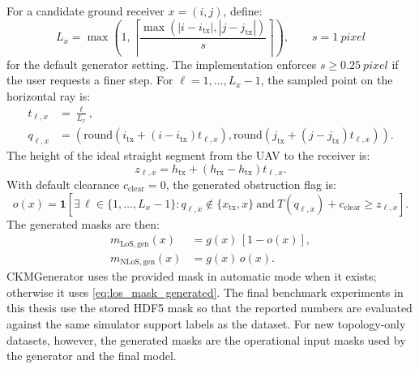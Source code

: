For a candidate ground receiver \(x=(i,j)\),
define:
\begin{equation}
  L_x
  =
  \max\!\left(
  1,
  \left\lceil
  \frac{\max(|i-i_{\mathrm{tx}}|,|j-j_{\mathrm{tx}}|)}{s}
  \right\rceil
  \right),
  \qquad s=\SI{1}{pixel}
  \label{eq:los_raycast_steps}
\end{equation}
for the default generator setting. The implementation enforces
\(s\ge \SI{0.25}{pixel}\) if the user requests a finer step. For
\(\ell=1,\ldots,L_x-1\), the sampled point on the horizontal ray is:
\begin{align}
  t_{\ell,x} &= \frac{\ell}{L_x},
  \label{eq:ray_t}\\
  q_{\ell,x}
  &=
  \left(
  \mathrm{round}\!\left(i_{\mathrm{tx}}+(i-i_{\mathrm{tx}})t_{\ell,x}\right),
  \mathrm{round}\!\left(j_{\mathrm{tx}}+(j-j_{\mathrm{tx}})t_{\ell,x}\right)
  \right).
  \label{eq:ray_sample_cell}
\end{align}
The height of the ideal straight segment from the UAV to the receiver is:
\begin{equation}
  z_{\ell,x}
  =
  h_{\mathrm{tx}}
  +
  \left(h_{\mathrm{rx}}-h_{\mathrm{tx}}\right)t_{\ell,x}.
  \label{eq:ray_line_height}
\end{equation}
With default clearance \(c_{\mathrm{clear}}=0\), the generated obstruction flag is:
\begin{equation}
  o(x)
  =
  \mathbf{1}\!\left[
  \exists\,\ell\in\{1,\ldots,L_x-1\}:
  q_{\ell,x}\notin\{x_{\mathrm{tx}},x\}
  \ \mathrm{and}\
  T(q_{\ell,x})+c_{\mathrm{clear}}\ge z_{\ell,x}
  \right].
  \label{eq:ray_obstruction}
\end{equation}
The generated masks are then:
\begin{align}
  m_{\mathrm{LoS,gen}}(x)&=g(x)\,[1-o(x)],
  \label{eq:los_mask_generated}\\
  m_{\mathrm{NLoS,gen}}(x)&=g(x)\,o(x).
  \label{eq:nlos_mask_generated}
\end{align}
CKMGenerator uses the provided mask in automatic mode when it exists; otherwise
it uses \eqref{eq:los_mask_generated}. The final benchmark experiments in this
thesis use the stored HDF5 mask so that the reported numbers are evaluated
against the same simulator support labels as the dataset. For new topology-only
datasets, however, the generated masks are the operational input masks used by
the generator and the final model.

